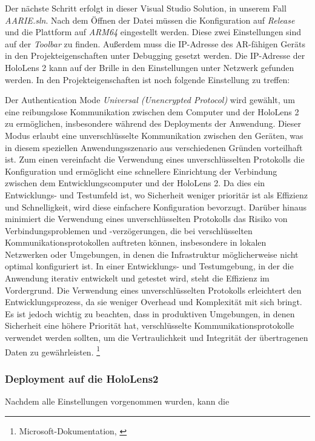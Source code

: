 Der nächste Schritt erfolgt in dieser Visual Studio Solution, in unserem Fall \textit{AARIE.sln}. Nach dem Öffnen der Datei müssen die Konfiguration auf \textit{Release} und die Plattform auf \textit{ARM64} eingestellt werden. Diese zwei Einstellungen sind auf der \textit{Toolbar} zu finden. Außerdem muss die IP-Adresse des AR-fähigen Geräts in den Projekteigenschaften unter Debugging gesetzt werden. Die IP-Adresse der HoloLens 2 kann auf der Brille in den Einstellungen unter Netzwerk gefunden werden. In den Projekteigenschaften ist noch folgende Einstellung zu treffen:

Der Authentication Mode \textit{Universal (Unencrypted Protocol)} wird gewählt, um eine reibungslose Kommunikation zwischen dem Computer und der HoloLens 2 zu ermöglichen, insbesondere während des Deployments der Anwendung. Dieser Modus erlaubt eine unverschlüsselte Kommunikation zwischen den Geräten, was in diesem speziellen Anwendungsszenario aus verschiedenen Gründen vorteilhaft ist. Zum einen vereinfacht die Verwendung eines unverschlüsselten Protokolls die Konfiguration und ermöglicht eine schnellere Einrichtung der Verbindung zwischen dem Entwicklungscomputer und der HoloLens 2. Da dies ein Entwicklungs- und Testumfeld ist, wo Sicherheit weniger prioritär ist als Effizienz und Schnelligkeit, wird diese einfachere Konfiguration bevorzugt. Darüber hinaus minimiert die Verwendung eines unverschlüsselten Protokolls das Risiko von Verbindungsproblemen und -verzögerungen, die bei verschlüsselten Kommunikationsprotokollen auftreten können, insbesondere in lokalen Netzwerken oder Umgebungen, in denen die Infrastruktur möglicherweise nicht optimal konfiguriert ist. In einer Entwicklungs- und Testumgebung, in der die Anwendung iterativ entwickelt und getestet wird, steht die Effizienz im Vordergrund. Die Verwendung eines unverschlüsselten Protokolls erleichtert den Entwicklungsprozess, da sie weniger Overhead und Komplexität mit sich bringt. Es ist jedoch wichtig zu beachten, dass in produktiven Umgebungen, in denen Sicherheit eine höhere Priorität hat, verschlüsselte Kommunikationsprotokolle verwendet werden sollten, um die Vertraulichkeit und Integrität der übertragenen Daten zu gewährleisten. \footnote{Microsoft-Dokumentation, \cite{Universal Unencrypted Protocol}}


\subsubsection*{Deployment auf die HoloLens2}
Nachdem alle Einstellungen vorgenommen wurden, kann die

